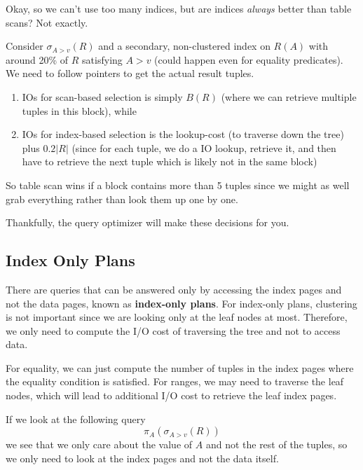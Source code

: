   Okay, so we can't use too many indices, but are indices \textit{always} better than table scans? Not exactly. 
  
  \begin{example}
    Consider $\sigma_{A > v} (R)$ and a secondary, non-clustered index on $R(A)$ with around 20\% of $R$ satisfying $A > v$ (could happen even for equality predicates). We need to follow pointers to get the actual result tuples. 
    \begin{enumerate}
      \item IOs for scan-based selection is simply $B(R)$ (where we can retrieve multiple tuples in this block), while 
      \item IOs for index-based selection is the lookup-cost (to traverse down the tree) plus $0.2 |R|$ (since for each tuple, we do a IO lookup, retrieve it, and then have to retrieve the next tuple which is likely not in the same block)
    \end{enumerate}
    So table scan wins if a block contains more than 5 tuples since we might as well grab everything rather than look them up one by one. 
  \end{example}

  Thankfully, the query optimizer will make these decisions for you. 

\subsection{Index Only Plans}

  \begin{definition}
    There are queries that can be answered only by accessing the index pages and not the data pages, known as \textbf{index-only plans}. For index-only plans, clustering is not important since we are looking only at the leaf nodes at most. Therefore, we only need to compute the I/O cost of traversing the tree and not to access data. 

    For equality, we can just compute the number of tuples in the index pages where the equality condition is satisfied. For ranges, we may need to traverse the leaf nodes, which will lead to additional I/O cost to retrieve the leaf index pages. 
  \end{definition}

  \begin{example}
    If we look at the following query 
    \begin{equation}
      \pi_A (\sigma_{A > v} (R))
    \end{equation}
    we see that we only care about the value of $A$ and not the rest of the tuples, so we only need to look at the index pages and not the data itself. 
  \end{example}

